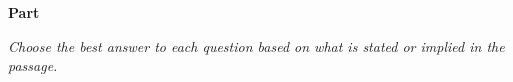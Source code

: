 \documentclass[../Exercise.tex]{subfiles}
\begin{document}
\begin{center}
	\large{\textbf{Part }}
\end{center} 

\vspace{5ex}

\noindent \textit{Choose the best answer to each question based on what is stated or implied in the passage.}


\raggedleft{}

\vspace{7ex}
\end{document}
